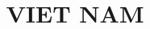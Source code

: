 \documentclass{article}
\title{VIET NAM}
\begin{document}
\maketitle

\begin{multicols}{2}
  
\end{multicols}
\end{document}
